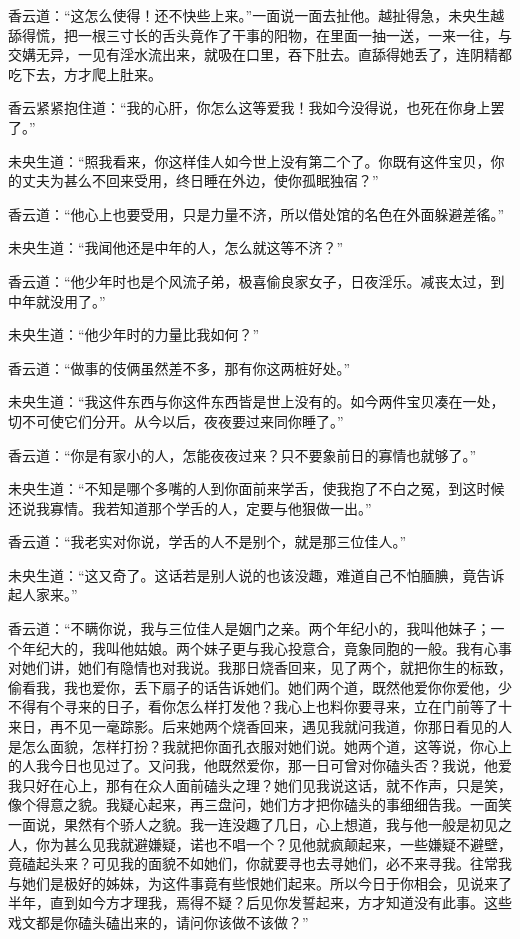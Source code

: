 \documentclass[a4paper,12pt,UTF8,twoside]{ctexbook}
\begin{document}
香云道：“这怎么使得！还不快些上来。”一面说一面去扯他。越扯得急，未央生越舔得慌，把一根三寸长的舌头竟作了干事的阳物，在里面一抽一送，一来一往，与交媾无异，一见有淫水流出来，就吸在口里，吞下肚去。直舔得她丢了，连阴精都吃下去，方才爬上肚来。

香云紧紧抱住道：“我的心肝，你怎么这等爱我！我如今没得说，也死在你身上罢了。”

未央生道：“照我看来，你这样佳人如今世上没有第二个了。你既有这件宝贝，你的丈夫为甚么不回来受用，终日睡在外边，使你孤眠独宿？”

香云道：“他心上也要受用，只是力量不济，所以借处馆的名色在外面躲避差徭。”

未央生道：“我闻他还是中年的人，怎么就这等不济？”

香云道：“他少年时也是个风流子弟，极喜偷良家女子，日夜淫乐。减丧太过，到中年就没用了。”

未央生道：“他少年时的力量比我如何？”

香云道：“做事的伎俩虽然差不多，那有你这两桩好处。”

未央生道：“我这件东西与你这件东西皆是世上没有的。如今两件宝贝凑在一处，切不可使它们分开。从今以后，夜夜要过来同你睡了。”

香云道：“你是有家小的人，怎能夜夜过来？只不要象前日的寡情也就够了。”

未央生道：“不知是哪个多嘴的人到你面前来学舌，使我抱了不白之冤，到这时候还说我寡情。我若知道那个学舌的人，定要与他狠做一出。”

香云道：“我老实对你说，学舌的人不是别个，就是那三位佳人。”

未央生道：“这又奇了。这话若是别人说的也该没趣，难道自己不怕腼腆，竟告诉起人家来。”

香云道：“不瞒你说，我与三位佳人是姻门之亲。两个年纪小的，我叫他妹子；一个年纪大的，我叫他姑娘。两个妹子更与我心投意合，竟象同胞的一般。我有心事对她们讲，她们有隐情也对我说。我那日烧香回来，见了两个，就把你生的标致，偷看我，我也爱你，丢下扇子的话告诉她们。她们两个道，既然他爱你你爱他，少不得有个寻来的日子，看你怎么样打发他？我心上也料你要寻来，立在门前等了十来日，再不见一毫踪影。后来她两个烧香回来，遇见我就问我道，你那日看见的人是怎么面貌，怎样打扮？我就把你面孔衣服对她们说。她两个道，这等说，你心上的人我今日也见过了。又问我，他既然爱你，那一日可曾对你磕头否？我说，他爱我只好在心上，那有在众人面前磕头之理？她们见我说这话，就不作声，只是笑，像个得意之貌。我疑心起来，再三盘问，她们方才把你磕头的事细细告我。一面笑一面说，果然有个骄人之貌。我一连没趣了几日，心上想道，我与他一般是初见之人，你为甚么见我就避嫌疑，诺也不唱一个？见他就疯颠起来，一些嫌疑不避壁，竟磕起头来？可见我的面貌不如她们，你就要寻也去寻她们，必不来寻我。往常我与她们是极好的姊妹，为这件事竟有些恨她们起来。所以今日于你相会，见说来了半年，直到如今方才理我，焉得不疑？后见你发誓起来，方才知道没有此事。这些戏文都是你磕头磕出来的，请问你该做不该做？”
\end{document}
